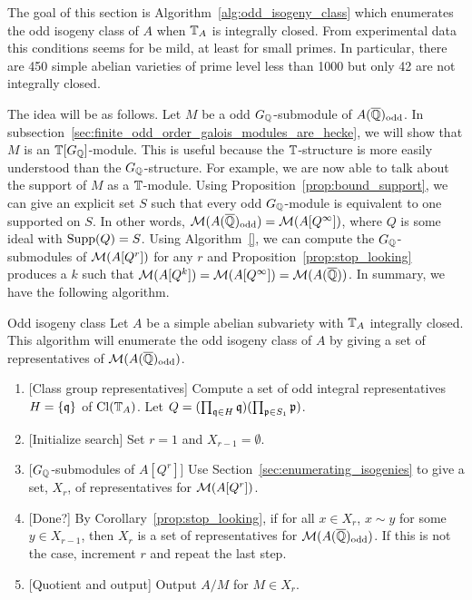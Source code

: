 \documentclass[11pt, proquest]{uwthesis}
\begin{document}
The goal of this section is Algorithm~\ref{alg:odd_isogeny_class} which
enumerates the odd isogeny class of $A$ when $\mathbb{T}_A$ is integrally closed. From
experimental data this conditions seems for be mild, at least for small primes.
In particular, there are 450 simple abelian varieties of prime level less than
1000 but only 42 are not integrally closed.

The idea will be as follows. Let $M$ be a odd $G_{\mathbb{Q}}$-submodule of
$A(\overline{\mathbb{Q}})_{\mathrm{odd}}$. In
subsection~\ref{sec:finite_odd_order_galois_modules_are_hecke}, we will show
that $M$ is an $\mathbb{T}[G_{\mathbb{Q}}]$-module. This is useful because the $\mathbb{T}$-structure is more
easily understood than the $G_{\mathbb{Q}}$-structure. For example, we are now able to
talk about the support of $M$ as a $\mathbb{T}$-module. Using
Proposition~\ref{prop:bound_support}, we can give an explicit set $S$ such that
every odd $G_{\mathbb{Q}}$-module is equivalent to one supported on $S$. In other words,
$\mathcal{M}(A(\overline{\mathbb{Q}})_{\mathrm{odd}})=\mathcal{M}(A[Q^\infty])$, where $Q$ is some ideal with
$\operatorname{Supp}(Q)=S$. Using Algorithm~\ref{}, we can compute the $G_{\mathbb{Q}}$-submodules of
$\mathcal{M}(A[Q^r])$ for any $r$ and Proposition~\ref{prop:stop_looking} produces a $k$
such that $\mathcal{M}(A[Q^k])=\mathcal{M}(A[Q^\infty])=\mathcal{M}(A(\overline{\mathbb{Q}}))$. In summary, we have the
following algorithm.
\begin{algorithm}{Odd isogeny class}%
    \label{alg:odd_isogeny_class}
    Let $A$ be a simple abelian subvariety with $\mathbb{T}_A$ integrally closed. This
    algorithm will enumerate the odd isogeny class of $A$ by giving a set of
    representatives of $\mathcal{M}(A(\overline{\mathbb{Q}})_{\mathrm{odd}})$.
    \begin{enumerate}
        \item{} [Class group representatives]
            Compute a set of odd integral representatives $H=\{\mathfrak{q}\}$ of
            $\operatorname{Cl}(\mathbb{T}_A)$. Let $Q = (\prod_{\mathfrak{q}\in H} \mathfrak{q})(\prod_{\mathfrak{p}\in S_1} \mathfrak{p})$. 
        \item{} [Initialize search]
            Set $r=1$ and $X_{r-1}=\emptyset$.
        \item{} [$G_{\mathbb{Q}}$-submodules of $A[Q^r]$]
            Use Section~\ref{sec:enumerating_isogenies} to give a set, $X_r$,
            of representatives for $\mathcal{M}(A[Q^r])$.
        \item{} [Done?]
            By Corollary~\ref{prop:stop_looking}, if for all $x\in X_r$, $x\sim
            y$ for some $y\in X_{r-1}$, then $X_r$ is a set of representatives
            for $\mathcal{M}(A(\overline{\mathbb{Q}})_{\mathrm{odd}})$. If this is not the case, increment $r$
            and repeat the last step.
        \item{} [Quotient and output]
            Output $A/M$ for $M\in X_r$.
    \end{enumerate}
\end{algorithm}
\end{document}
